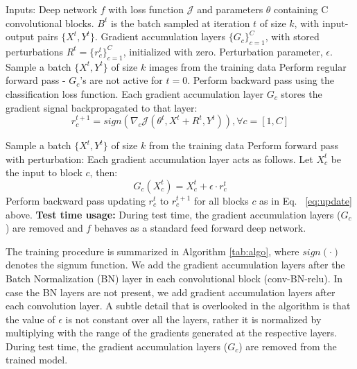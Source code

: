 \documentclass[letterpaper]{article} %
\begin{document}
\begin{algorithm*}[!htb]
\caption{Efficient layerwise adversarial training procedure for improved regularization}\label{alg:algo}
\label{tab:algo}
\begin{algorithmic}[1]
\State Inputs: Deep network $f$ with loss function $\mathcal{J}$ and parameters $\theta$ containing C convolutional blocks. ${B^t}$ is the batch sampled at iteration $t$ of size $k$, with input-output pairs $\{X^{t},Y^{t}\}$. Gradient accumulation layers $\{G_c\}_{c=1}^{C}$, with stored perturbations $R^t=\{r^{t}_c\}_{c=1}^{C}$, initialized with zero. Perturbation parameter, $\epsilon$.
		\State Sample a batch $\{X^t,Y^t\}$ of size $k$ images from the training data
        \State Perform regular forward pass - $G_c$'s are not active for $t=0$.
        \State Perform backward pass using the classification loss function. Each gradient accumulation layer $G_{c}$ stores the gradient signal backpropagated to that layer:
        \begin{equation}
        r^{t+1}_c = sign(\nabla_{c}\mathcal{J}(\theta^t,X^t+R^t,Y^t)),  \forall c = [1,C]
        \label{eq:update}
        \end{equation}

		\State Sample a batch $\{X^t,Y^t\}$ of size $k$ from the training data
        \State Perform forward pass with perturbation: Each gradient accumulation layer acts as follows. \noindent Let $X^{t}_{c}$ be the input to block $c$, then:
        \begin{equation}
        		G_c(X^{t}_{c})=X^{t}_{c}+\epsilon \cdot r^{t}_c
         \end{equation}
        \State Perform backward pass updating $r^{t}_c$ to $r^{t+1}_c$ for all blocks $c$ as in Eq. ~\ref{eq:update} above.
\EndFor
\State \textbf{Test time usage:} During test time, the gradient accumulation layers ($G_c$) are removed and $f$ behaves as a standard feed forward deep network.
\end{algorithmic}
\end{algorithm*}

 The training procedure is summarized in Algorithm \ref{tab:algo}, where $sign(\cdot)$ denotes the signum function. We add the gradient accumulation layers after the Batch Normalization (BN) layer in each convolutional block (conv-BN-relu). In case the BN layers are not present, we add gradient accumulation layers after each convolution layer. A subtle detail that is overlooked in the algorithm is that the value of $\epsilon$ is not constant over all the layers, rather it is normalized by multiplying with the range of the gradients generated at the respective layers. During test time, the gradient accumulation layers ($G_c$) are removed from the trained model.
\end{document}
